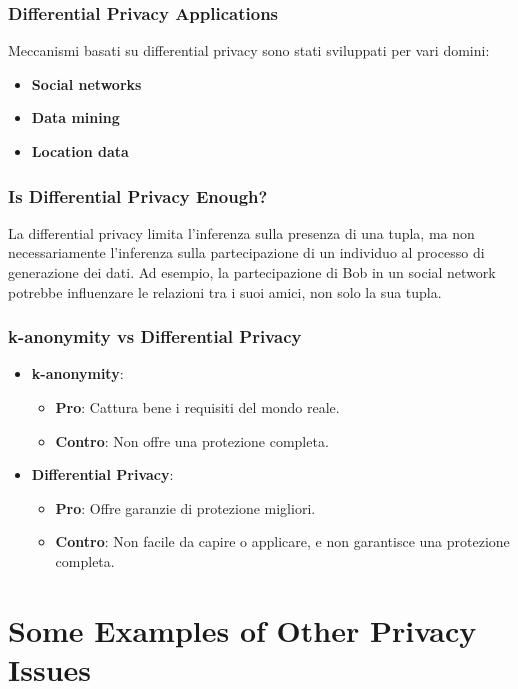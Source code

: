 \documentclass{report}
\begin{document}
\subsubsection{ Differential Privacy Applications}
Meccanismi basati su differential privacy sono stati sviluppati per vari domini:
\begin{itemize}
    \item \textbf{Social networks} 
    \item \textbf{Data mining} 
    \item \textbf{Location data}
\end{itemize}

\subsubsection{ Is Differential Privacy Enough?}
La differential privacy limita l'inferenza sulla presenza di una tupla, ma non necessariamente l'inferenza sulla partecipazione di un individuo al processo di generazione dei dati. 
Ad esempio, la partecipazione di Bob in un social network potrebbe influenzare le relazioni tra i suoi amici, non solo la sua tupla.

\subsubsection{ k-anonymity vs Differential Privacy}

\begin{itemize}
    \item \textbf{k-anonymity}:
    \begin{itemize}
        \item \textbf{Pro}: Cattura bene i requisiti del mondo reale.
        \item \textbf{Contro}: Non offre una protezione completa.
    \end{itemize}
    
    \item \textbf{Differential Privacy}:
    \begin{itemize}
        \item \textbf{Pro}: Offre garanzie di protezione migliori.
        \item \textbf{Contro}: Non facile da capire o applicare, e non garantisce una protezione completa.
    \end{itemize}
\end{itemize}


\section{Some Examples of Other Privacy Issues}
\end{document}
